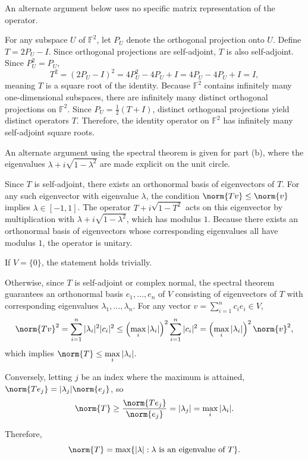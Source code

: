 
An alternate argument below uses no specific matrix representation of the operator.

\begin{csp}
    For any subspace $U$ of $\mathbb{F}^2$, let $P_U$ denote the orthogonal projection onto $U$. Define $T=2P_U-I$. Since orthogonal projections are self-adjoint, $T$ is also self-adjoint. Since $P_U^2=P_U$,
    $$T^2=\left(2P_U-I\right)^2=4P_U^2-4P_U+I=4P_U-4P_U+I=I,$$
    meaning $T$ is a square root of the identity. Because $\mathbb{F}^2$ contains infinitely many one-dimensional subspaces, there are infinitely many distinct orthogonal projections on $\mathbb{F}^2$. Since $P_U=\frac{1}{2}(T+I)$, distinct orthogonal projections yield distinct operators $T$. Therefore, the identity operator on $\mathbb{F}^2$ has infinitely many self-adjoint square roots.
\end{csp}


An alternate argument using the spectral theorem is given for part (b), where the eigenvalues $\lambda + i\sqrt{1 - \lambda^2}$ are made explicit on the unit circle.

\begin{csp}
    Since $T$ is self-adjoint, there exists an orthonormal basis of eigenvectors of $T$. For any such eigenvector with eigenvalue $\lambda$, the condition $\norm{Tv} \leq \norm{v}$ implies $\lambda \in [-1,1]$. The operator $T+i\sqrt{1-T^2}$ acts on this eigenvector by multiplication with $\lambda+i \sqrt{1-\lambda^2}$, which has modulus $1$. Because there exists an orthonormal basis of eigenvectors whose corresponding eigenvalues all have modulus $1$, the operator is unitary.
\end{csp}


\begin{csp}
    If $V=\{0\}$, the statement holds trivially.

    Otherwise, since $T$ is self-adjoint or complex normal, the spectral theorem guarantees an orthonormal basis $e_1,\dots,e_n$ of $V$ consisting of eigenvectors of $T$ with corresponding eigenvalues $\lambda_1,\dots,\lambda_n$. For any vector ${v=\sum \limits^{n}_{i=1} c_i e_i \in V}$,
    $$\norm{Tv}^2=\sum^{n}_{i=1} |\lambda_i|^2 |c_i|^2 \leq \left(\max_i |\lambda_i| \right)^2 \sum^{n}_{i=1} |c_i|^2=\left(\max_i |\lambda_i| \right)^2 \norm{v}^2,$$
    which implies $\norm{T} \leq \max \limits_i |\lambda_i|$.

    Conversely, letting $j$ be an index where the maximum is attained, $\norm{Te_j}=|\lambda_j| \norm{e_j}$, so
    $$\norm{T} \geq \frac{\norm{Te_j}}{\norm{e_j}}=|\lambda_j|=\max_i |\lambda_i|.$$

    Therefore,
    $$\norm{T}=\max \{|\lambda|: \lambda \text{ is an eigenvalue of } T\}.$$
\end{csp}